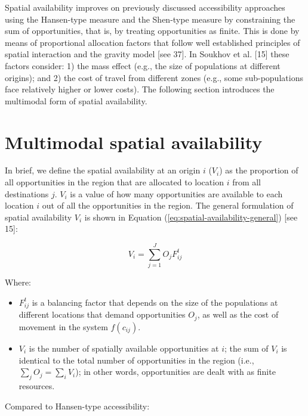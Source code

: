 \documentclass[10pt,letterpaper]{article}
\begin{document}
Spatial availability improves on previously discussed accessibility
approaches using the Hansen-type measure and the Shen-type measure by
constraining the sum of opportunities, that is, by treating
opportunities as finite. This is done by means of proportional
allocation factors that follow well established principles of spatial
interaction and the gravity model {[}see 37{]}. In Soukhov et al.
{[}15{]} these factors consider: 1) the mass effect (e.g., the size of
populations at different origins); and 2) the cost of travel from
different zones (e.g., some sub-populations face relatively higher or
lower costs). The following section introduces the multimodal form of
spatial availability.

\hypertarget{multimodal-spatial-availability}{%
\section{Multimodal spatial
availability}\label{multimodal-spatial-availability}}

In brief, we define the spatial availability at an origin \(i\)
(\(V_{i}\)) as the proportion of all opportunities in the region that
are allocated to location \(i\) from all destinations \(j\). \(V_{i}\)
is a value of how many opportunities are available to each location
\(i\) out of all the opportunities in the region. The general
formulation of spatial availability \(V_{i}\) is shown in Equation
(\ref{eq:spatial-availability-general}) {[}see 15{]}:

\begin{equation}
\label{eq:spatial-availability-general}
V_i = \sum_{j=1}^J O_jF^t_{ij}
\end{equation}

\noindent Where:

\begin{itemize}
\item
  \(F^t_{ij}\) is a balancing factor that depends on the size of the
  populations at different locations that demand opportunities \(O_j\),
  as well as the cost of movement in the system \(f(c_{ij})\).
\item
  \(V_i\) is the number of spatially available opportunities at \(i\);
  the sum of \(V_{i}\) is identical to the total number of opportunities
  in the region (i.e., \(\sum_j O_j = \sum_i V_i\)); in other words,
  opportunities are dealt with as finite resources.
\end{itemize}

Compared to Hansen-type accessibility:
\end{document}
